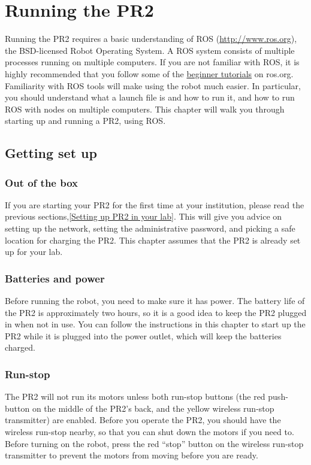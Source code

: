 \chapter{Running the PR2}
Running the PR2 requires a basic understanding of ROS (\href{http://www.ros.org}{http://www.ros.org}), the BSD-licensed 
Robot Operating System.  A ROS system consists of multiple processes running on multiple computers.  If you are not 
familiar with ROS, it is highly recommended that you follow some of the \href{http://www.ros.org/wiki/ROS/Tutorials}{beginner tutorials} 
on ros.org. Familiarity with ROS tools will make using the robot much easier.  In particular, you should understand 
what a launch file is and how to run it, and how to run ROS with nodes on multiple computers. This chapter will walk 
you through starting up and running a PR2, using ROS.

\section{Getting set up}
\subsection{Out of the box}
If you are starting your PR2 for the first time at your institution, please read the previous sections,\ref{Setting up PR2 in your lab}.  
This will give you advice on setting up the network, setting the administrative password, and picking a safe location for 
charging the PR2.  This chapter assumes that the PR2 is already set up for your lab.
\subsection{Batteries and power}
Before running the robot, you need to make sure it has power.  The battery life of the PR2 is approximately two hours, 
so it is a good idea to keep the PR2 plugged in when not in use.  You can follow the instructions in this chapter to start up 
the PR2 while it is plugged into the power outlet, which will keep the batteries charged.
\subsection{Run-stop}
The PR2 will not run its motors unless both run-stop buttons (the red push-button on the middle of the PR2's back, and 
the yellow wireless run-stop transmitter) are enabled.  Before you operate the PR2, you should have the wireless run-stop 
nearby, so that you can shut down the motors if you need to.  Before turning on the robot, press the red ``stop'' button on the 
wireless run-stop transmitter to prevent the motors from moving before you are ready.

